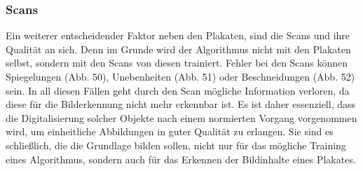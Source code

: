 \documentclass[a4paper,12pt,ngerman]{article}
\begin{document}
\subsubsection{Scans}
Ein weiterer entscheidender Faktor neben den Plakaten, sind die Scans und ihre Qualität an sich. Denn im Grunde wird der Algorithmus nicht mit den Plakaten selbst, sondern mit den Scans von diesen trainiert. Fehler bei den Scans können Spiegelungen (Abb. 50), Unebenheiten (Abb. 51) oder Beschneidungen (Abb. 52) sein. In all diesen Fällen geht durch den Scan mögliche Information verloren, da diese für die Bilderkennung nicht mehr erkennbar ist. Es ist daher essenziell, dass die Digitalisierung solcher Objekte nach einem normierten Vorgang vorgenommen wird, um einheitliche Abbildungen in guter Qualität zu erlangen. Sie sind es schließlich, die die Grundlage bilden sollen, nicht nur für das mögliche Training eines Algorithmus, sondern auch für das Erkennen der Bildinhalte eines Plakates. \\
\end{document}
